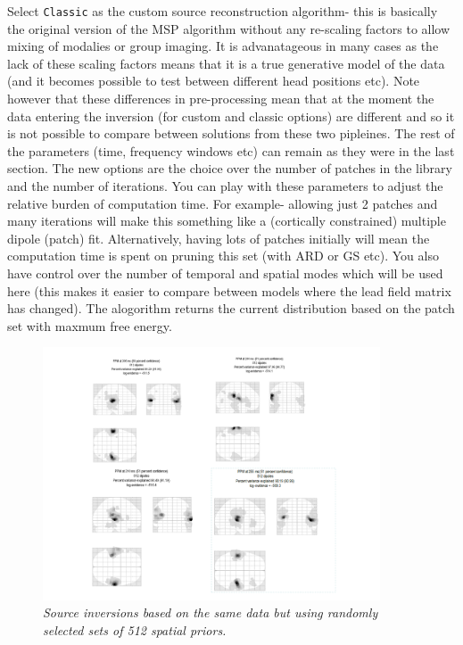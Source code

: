 Select \texttt{Classic} as the custom source reconstruction algorithm- this is basically the original version of the MSP algorithm without any re-scaling factors to allow mixing of modalies or group imaging. It is advanatageous in many cases as the lack of these scaling factors means that it is a true generative model of the data (and it becomes possible to test between different head positions etc). Note however that these differences in pre-processing mean that at the moment the data entering the inversion (for custom and classic options) are different and so it is not possible to compare between solutions from these two pipleines.
 The rest of the parameters (time, frequency windows etc) can remain as they were in the last section. The new options are the choice over the number of patches in the library  and the number of iterations. You can play with these parameters to adjust the relative burden of computation time. For example- allowing just 2 patches and many iterations will make this something like a (cortically constrained) multiple dipole (patch) fit. Alternatively, having lots of patches initially will mean the computation time is spent on pruning this set (with ARD or GS etc). 
You also have control over the number of temporal and spatial modes which will be used here (this makes it easier to compare between models where the lead field matrix has changed). 
The alogorithm returns the current distribution based on the patch set with maxmum free energy.

\begin{figure}
\begin{center}
\includegraphics[width=100mm]{meg_sloc/slide8}
\caption{\em  Source inversions based on the same data but using randomly selected sets of 512 spatial priors.\label{meg_sloc:fig:8}}
\end{center}
\end{figure}


